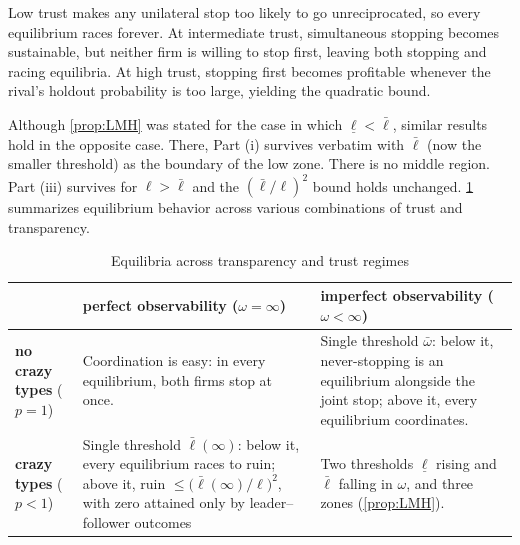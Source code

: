 \documentclass[12pt,reqno]{article}
\theoremstyle{definition} \newtheorem{example}{Example}
\theoremstyle{definition} \newtheorem{condition}{Condition}
\theoremstyle{definition} \newtheorem{corollary}{Corollary}
\theoremstyle{definition} \newtheorem{claim}{Claim}
\theoremstyle{definition} \newtheorem{definition}{Definition}
\theoremstyle{definition} \newtheorem{conjecture}{Conjecture}
\theoremstyle{definition} \newtheorem{Lemma}{Lemma}
\theoremstyle{definition} \newtheorem{lemma}{Lemma}
\theoremstyle{plain} \newtheorem{theorem}{Theorem}
\theoremstyle{definition} \newtheorem{assumption}{Assumption}
\theoremstyle{definition} \newtheorem*{assumptionnonumber}{Assumption}
\theoremstyle{definition} \newtheorem*{theoremNoNumber}{Proposition}
\theoremstyle{definition}
\theoremstyle{definition}\newtheorem{proposition}{Proposition}
\theoremstyle{definition} \newtheorem{result}{Result}
\theoremstyle{definition} \newtheorem*{definitionNoNumber}{Definition}
\theoremstyle{definition} \newtheorem{Definition}{Definition}
\theoremstyle{definition} \newtheorem*{DefinitionNoNumber}{Definition}
\theoremstyle{definition} \newtheorem*{fact}{Fact}
\theoremstyle{definition} \newtheorem*{property}{Property}
\theoremstyle{definition} \newtheorem{remark}{Remark}
\begin{document}
 Low trust makes any unilateral stop too likely to go unreciprocated, so every equilibrium races forever. At intermediate trust, simultaneous stopping becomes sustainable, but neither firm is willing to stop first, leaving both stopping and racing equilibria. At high trust, stopping first becomes profitable whenever the rival’s holdout probability is too large, yielding the quadratic bound.

Although \cref{prop:LMH} was stated for the case in which $\underline \ell < \bar \ell$, similar results hold in the opposite case. There, Part (i) survives verbatim with $\bar\ell$ (now the smaller threshold) as the boundary of the low zone. There is no middle region. Part (iii) survives for $\ell>\bar\ell$ and the $(\bar\ell/\ell)^2$ bound holds unchanged. \cref{tab:2x2} summarizes equilibrium behavior across various combinations of trust and transparency.  

\begin{table}[H]
\centering
\footnotesize
\renewcommand{\arraystretch}{1.5}
\begin{tabular}{@{}p{1.9cm}p{5.6cm}p{5.9cm}@{}}
\toprule
& \textbf{perfect observability} ($\omega=\infty$) & \textbf{imperfect observability} ($\omega<\infty$) \\
\midrule
\textbf{no crazy types} ($p=1$) & Coordination is easy: in every equilibrium, both firms stop at once. & Single threshold $\bar\omega$: below it, never-stopping is an equilibrium alongside the joint stop; above it, every equilibrium coordinates.  \\
\addlinespace
\textbf{crazy types} ($p<1$) & Single threshold $\bar\ell(\infty)$: below it, every equilibrium races to ruin; above it, ruin $\le\big(\bar\ell(\infty)/\ell\big)^2$, with zero attained only by leader--follower outcomes & Two thresholds $\underline\ell$ rising and $\bar\ell$ falling in $\omega$, and three zones (\cref{prop:LMH}).  \\
\bottomrule
\end{tabular}
\caption{Equilibria across transparency and trust regimes}
\label{tab:2x2}
\end{table}
\end{document}
